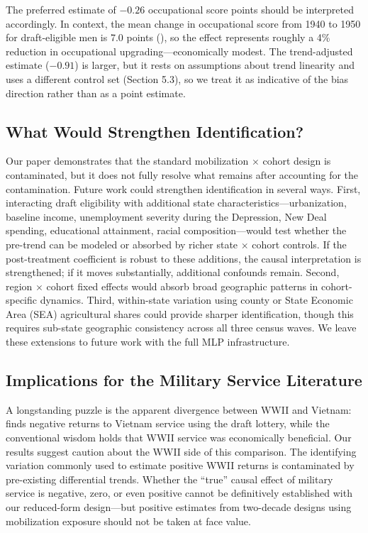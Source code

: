 \documentclass[12pt]{article}
\begin{document}
The preferred estimate of $-0.26$ occupational score points should be interpreted accordingly. In context, the mean change in occupational score from 1940 to 1950 for draft-eligible men is 7.0 points (), so the effect represents roughly a 4\% reduction in occupational upgrading---economically modest. The trend-adjusted estimate ($-0.91$) is larger, but it rests on assumptions about trend linearity and uses a different control set (Section 5.3), so we treat it as indicative of the bias direction rather than as a point estimate.

\subsection{What Would Strengthen Identification?}

Our paper demonstrates that the standard mobilization $\times$ cohort design is contaminated, but it does not fully resolve what remains after accounting for the contamination. Future work could strengthen identification in several ways. First, interacting draft eligibility with additional state characteristics---urbanization, baseline income, unemployment severity during the Depression, New Deal spending, educational attainment, racial composition---would test whether the pre-trend can be modeled or absorbed by richer state $\times$ cohort controls. If the post-treatment coefficient is robust to these additions, the causal interpretation is strengthened; if it moves substantially, additional confounds remain. Second, region $\times$ cohort fixed effects would absorb broad geographic patterns in cohort-specific dynamics. Third, within-state variation using county or State Economic Area (SEA) agricultural shares could provide sharper identification, though this requires sub-state geographic consistency across all three census waves. We leave these extensions to future work with the full MLP infrastructure.

\subsection{Implications for the Military Service Literature}

A longstanding puzzle is the apparent divergence between WWII and Vietnam: \citet{angrist1990} finds negative returns to Vietnam service using the draft lottery, while the conventional wisdom holds that WWII service was economically beneficial. Our results suggest caution about the WWII side of this comparison. The identifying variation commonly used to estimate positive WWII returns is contaminated by pre-existing differential trends. Whether the ``true'' causal effect of military service is negative, zero, or even positive cannot be definitively established with our reduced-form design---but positive estimates from two-decade designs using mobilization exposure should not be taken at face value.
\end{document}
